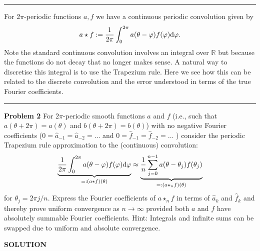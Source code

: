 \documentclass[12pt,a4paper]{article}
\def\bbR{ {\mathbb R} }
\begin{document}
\rule{\textwidth}{1pt}
For 2\ensuremath{\pi}-periodic functions $a,f$ we have a continuous periodic convolution given by
\[
a \star f := {1 \over 2\pi} \int_0^{2\pi}  a(\theta-\varphi) f(\varphi) {\rm d} \varphi.
\]
Note the standard continuous convolution involves an integral over $\ensuremath{\bbR}$ but because the functions do not decay that no longer makes sense. A natural way to discretise this integral is to use the Trapezium rule. Here we see how this can be related to the discrete convolution and the error understood in terms of the true Fourier coefficients.

\rule{\textwidth}{1pt}
\textbf{Problem 2}  For $2\ensuremath{\pi}$-periodic smooth functions $a$ and $f$ (i.e., such that $a(\ensuremath{\theta}+2\ensuremath{\pi}) = a(\ensuremath{\theta})$ and $b(\ensuremath{\theta}+2\ensuremath{\pi}) = b(\ensuremath{\theta})$) with no negative Fourier coefficients ($0 = \hat{a}_{-1} = \hat{a}_{-2} = \ensuremath{\ldots}$ and $0 = \hat{f}_{-1} = \hat{f}_{-2} = \ensuremath{\ldots}$ ) consider the periodic Trapezium rule approximation to the (continuous) convolution:
\[
\underbrace{ {1 \over 2\pi} \int_0^{2\pi}  a(\theta-\varphi) f(\varphi) {\rm d} \varphi}_{=: (a \star f)(\theta)} \approx \underbrace{{1 \over n} \sum_{j=0}^{n-1} a(\theta-\theta_j) f(\theta_j)}_{
=: (a \star_n f)(\theta)}
\]
for $\ensuremath{\theta}_j = 2\ensuremath{\pi}j/n$. Express the Fourier coefficients of $a \ensuremath{\star}_n f$  in terms of $\hat{a}_k$ and $\hat{f}_k$ and thereby prove uniform convergence as $n \ensuremath{\rightarrow} \ensuremath{\infty}$ provided both $a$ and $f$ have absolutely summable Fourier coefficients. Hint: Integrals and infinite sums can be swapped due to uniform and absolute convergence.

\textbf{SOLUTION}
\end{document}
